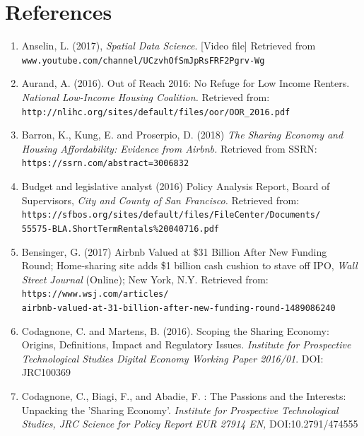 \documentclass[10pt,letterpaper,onecolumn]{article}
\begin{document}
\section*{References}

\begin{enumerate}
\item Anselin, L. (2017), \emph{Spatial Data Science}. [Video file] Retrieved from
\\\texttt{www.youtube.com/channel/UCzvhOfSmJpRsFRF2Pgrv-Wg}

\item Aurand, A. (2016). Out of Reach 2016: No Refuge for Low Income Renters.
\emph{National Low-Income Housing Coalition.} Retrieved from: \texttt{http://nlihc.org/sites/default/files/oor/OOR\_2016.pdf}

\item Barron, K., Kung, E. and Proserpio, D. (2018) \emph{The Sharing Economy and Housing Affordability: Evidence from Airbnb.} Retrieved from SSRN:
  \texttt{https://ssrn.com/abstract=3006832}

\item Budget and legislative analyst (2016) Policy Analysis Report, Board of Supervisors, \emph{City and County of San Francisco.} Retrieved from:
  \\\texttt{https://sfbos.org/sites/default/files/FileCenter/Documents/}
  \\\hspace*{1cm}\texttt{55575-BLA.ShortTermRentals\%20040716.pdf}

\item Bensinger, G. (2017) Airbnb Valued at \$31 Billion After New Funding Round; Home-sharing site adds \$1 billion cash cushion to stave off IPO, \emph{Wall Street
    Journal} (Online); New York, N.Y. \mbox{Retrieved} from:
  \\\texttt{https://www.wsj.com/articles/}
  \\\hspace*{1cm}\texttt{airbnb-valued-at-31-billion-after-new-funding-round-1489086240}

\item Codagnone, C. and Martens, B. (2016). Scoping the Sharing Economy: Origins, Definitions, Impact and Regulatory Issues. \emph{Institute for
    Prospective Technological Studies Digital Economy Working Paper 2016/01}. DOI: JRC100369

\item Codagnone, C., Biagi, F., and Abadie, F. : The Passions and the Interests: Unpacking the 'Sharing Economy'. \emph{Institute for Prospective
    Technological Studies, JRC Science for Policy Report EUR 27914 EN,} DOI:10.2791/474555


\end{enumerate}
\end{document}
